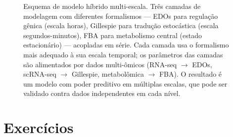 \begin{figure}[htbp]
\centering
{}
\caption{Esquema de modelo híbrido multi-escala. Três camadas de modelagem com diferentes formalismos --- EDOs para regulação gênica (escala horas), Gillespie para tradução estocástica (escala segundos-minutos), FBA para metabolismo central (estado estacionário) --- acopladas em série. Cada camada usa o formalismo mais adequado à sua escala temporal; os parâmetros das camadas são alimentados por dados multi-ômicos (RNA-seq $\to$ EDOs, scRNA-seq $\to$ Gillespie, metabolômica $\to$ FBA). O resultado é um modelo com poder preditivo em múltiplas escalas, que pode ser validado contra dados independentes em cada nível.}
\label{fig:11-hibrido}
\end{figure}

\section{Exercícios}
\label{sec:11-exercicios}

